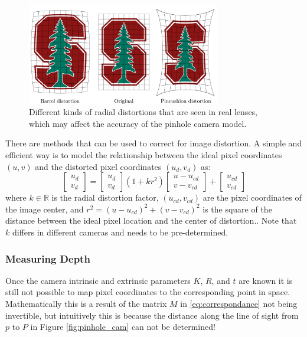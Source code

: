 \begin{figure}[ht]
\includegraphics[width=0.75\textwidth]{tex/figs/ch09_figs/lensdistortion.png}
\centering
\caption{Different kinds of radial distortions that are seen in real lenses, which may affect the accuracy of the pinhole camera model.}
\label{fig:distortion}
\end{figure}

There are methods that can be used to correct for image distortion. A simple and efficient way is to model the relationship between the ideal pixel coordinates $(u,v)$ and the distorted pixel coordinates $(u_d,v_d)$ as:
\begin{equation}
\begin{bmatrix}
    u_d \\
    v_d
\end{bmatrix}
=
\begin{bmatrix}
    u_d \\
    v_d
\end{bmatrix}
(1+kr^2)
\begin{bmatrix}
    u-u_{cd} \\
    v-v_{cd}
\end{bmatrix}
+
\begin{bmatrix}
    u_{cd} \\
    v_{cd}
\end{bmatrix}
\end{equation}
where $k \in \mathbb{R}$ is the radial distortion factor, $(u_{cd}, v_{cd})$ are the pixel coordinates of the image center, and $r^2=(u-u_{cd})^2+(v-v_{cd})^2$ is the square of the distance between the ideal pixel location and the center of distortion.. Note that $k$ differs in different cameras and needs to be pre-determined.

\subsubsection{Measuring Depth}
Once the camera intrinsic and extrinsic parameters $K$, $R$, and $t$ are known it is still not possible to map pixel coordinates to the corresponding point in space. Mathematically this is a result of the matrix $M$ in \eqref{eq:correspondance} not being invertible, but intuitively this is because the distance along the line of sight from $p$ to $P$ in Figure \ref{fig:pinhole_cam} can not be determined!

